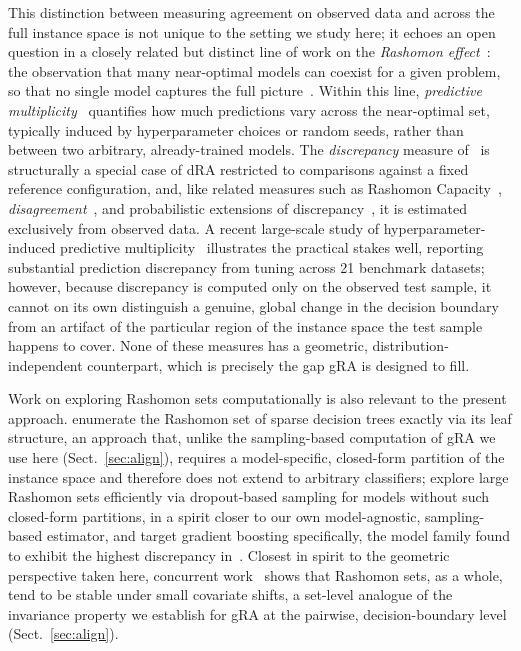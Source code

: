 \documentclass[runningheads]{llncs}
\begin{document}
This distinction between measuring agreement on observed data and across the full instance space is not unique to the setting we study here; it echoes an open question in a closely related but distinct line of work on the \emph{Rashomon effect}~\cite{Breiman2001}: the observation that many near-optimal models can coexist for a given problem, so that no single model captures the full picture~\cite{Fisher2019,Rudin2024,Biecek2024}. Within this line, \emph{predictive multiplicity}~\cite{Marx2020,Renard2024} quantifies how much predictions vary across the near-optimal set, typically induced by hyperparameter choices or random seeds, rather than between two arbitrary, already-trained models. The \emph{discrepancy} measure of~\cite{Marx2020} is structurally a special case of dRA restricted to comparisons against a fixed reference configuration, and, like related measures such as Rashomon Capacity~\cite{HsuCalmon2022}, \emph{disagreement}~\cite{Kulynych2023}, and probabilistic extensions of discrepancy~\cite{WatsonDaniels2023}, it is estimated exclusively from observed data. A recent large-scale study of hyperparameter-induced predictive multiplicity~\cite{Cavus2025} illustrates the practical stakes well, reporting substantial prediction discrepancy from tuning across 21 benchmark datasets; however, because discrepancy is computed only on the observed test sample, it cannot on its own distinguish a genuine, global change in the decision boundary from an artifact of the particular region of the instance space the test sample happens to cover. None of these measures has a geometric, distribution-independent counterpart, which is precisely the gap gRA is designed to fill.

Work on exploring Rashomon sets computationally is also relevant to the present approach. \cite{Xin2022} enumerate the Rashomon set of sparse decision trees exactly via its leaf structure, an approach that, unlike the sampling-based computation of gRA we use here (Sect.~\ref{sec:align}), requires a model-specific, closed-form partition of the instance space and therefore does not extend to arbitrary classifiers; \cite{Hsu2024dropout} explore large Rashomon sets efficiently via dropout-based sampling for models without such closed-form partitions, in a spirit closer to our own model-agnostic, sampling-based estimator, and \cite{Hsu2024rashomongb} target gradient boosting specifically, the model family found to exhibit the highest discrepancy in~\cite{Cavus2025}. Closest in spirit to the geometric perspective taken here, concurrent work~\cite{Hsu2025double} shows that Rashomon sets, as a whole, tend to be stable under small covariate shifts, a set-level analogue of the invariance property we establish for gRA at the pairwise, decision-boundary level (Sect.~\ref{sec:align}).
\end{document}
